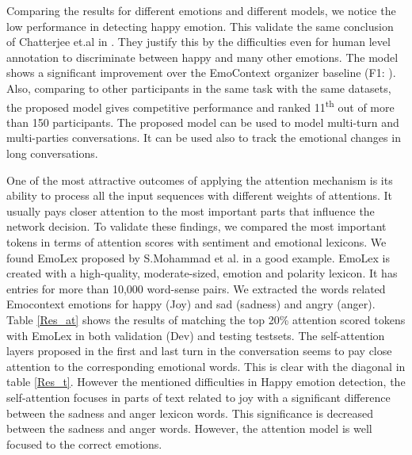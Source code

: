 \documentclass{article}
\begin{document}
Comparing the results for different emotions and different models, we notice the low performance in detecting happy emotion. This validate the same conclusion of Chatterjee et.al in . They justify this by the difficulties even for human level annotation to discriminate between happy and many other emotions. 
The model shows a significant improvement over the EmoContext organizer baseline (F1: ). Also, comparing to other participants in the same task with the same datasets, the proposed model gives competitive performance and ranked 11\textsuperscript{th} out of more than 150 participants. The proposed model can be used to model multi-turn and multi-parties conversations. It can be used also to track the emotional changes in long conversations.

One of the most attractive outcomes of applying the attention mechanism is its ability to process all the input sequences with different weights of attentions. It usually pays closer attention to the most important parts that influence the network decision. To validate these findings, we compared the most important tokens in terms of attention scores with sentiment and emotional lexicons. We found EmoLex proposed by S.Mohammad et al. in   a good example. EmoLex is created with a high-quality, moderate-sized, emotion and polarity lexicon. It has entries for more than 10,000 word-sense pairs. We extracted the words related Emocontext emotions for happy (Joy) and sad (sadness) and angry (anger). Table \ref{Res_at} shows the results of matching the top 20\% attention scored tokens with EmoLex in both validation (Dev) and testing testsets. The self-attention layers proposed in the first  and last turn  in the conversation seems to pay close attention to the corresponding emotional words. This is clear with the diagonal in table \ref{Res_t}. However the mentioned difficulties in Happy emotion detection, the self-attention focuses in parts of text related to joy with a significant difference between the sadness and anger lexicon words. This significance is decreased between the sadness and anger words. However, the attention model is well focused to the correct emotions.  
\end{document}
